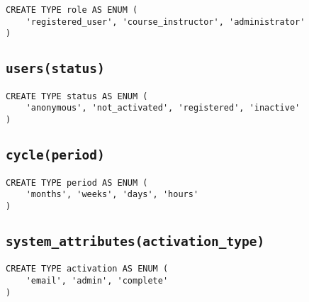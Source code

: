 \begin{verbatim}
CREATE TYPE role AS ENUM (
    'registered_user', 'course_instructor', 'administrator'
)
\end{verbatim}

\subsection{\texttt{users(status)}}

\begin{verbatim}
CREATE TYPE status AS ENUM (
    'anonymous', 'not_activated', 'registered', 'inactive'
)
\end{verbatim}

\subsection{\texttt{cycle(period)}}

\begin{verbatim}
CREATE TYPE period AS ENUM (
    'months', 'weeks', 'days', 'hours'
)
\end{verbatim}

\subsection{\texttt{system\_attributes(activation\_type)}}

\begin{verbatim}
CREATE TYPE activation AS ENUM (
    'email', 'admin', 'complete'
)
\end{verbatim}
